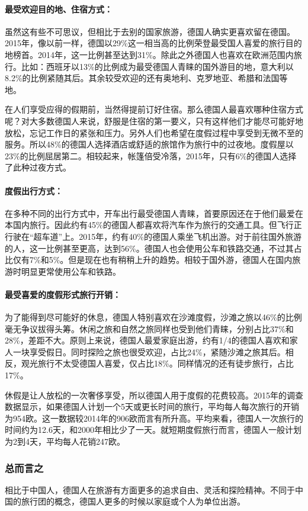 \paragraph{最受欢迎目的地、住宿方式：}

虽然这有些不可思议，但相比于去别的国家旅游，德国人确实更喜欢留在德国。2015年，像以前一样，德国以29\%这一相当高的比例荣登最受国人喜爱的旅行目的地榜首。2014年，这一比例甚至达到31\%。除此之外德国人也喜欢在欧洲范围内旅行。比如：西班牙以13\%的比例成为最受德国人青睐的国外游目的地，意大利以8.2\%的比例紧随其后。其余较受欢迎的还有奥地利、克罗地亚、希腊和法国等地。

在人们享受应得的假期前，当然得提前订好住宿。那么德国人最喜欢哪种住宿方式呢？对大多数德国人来说，舒服是住宿的第一要义，只有这样他们才能尽可能好地放松，忘记工作日的紧张和压力。另外人们也希望在度假过程中享受到无微不至的服务。所以48\%的德国人选择酒店或舒适的旅馆作为旅行中的过夜地。度假屋以23\%的比例屈居第二。相较起来，帐篷倍受冷落，2015年，只有6\%的德国人选择了此种过夜方式。



\paragraph{度假出行方式：}

在多种不同的出行方式中，开车出行最受德国人青睐，首要原因还在于他们最爱在本国内旅行。因此约有45\%的德国人都喜欢将汽车作为旅行的交通工具。但飞行正行驶在“超车道”上。2015年，约有40\%的德国人乘坐飞机出游。对于前往国外旅游的人，这一比例甚至更高，达到56\%。德国人也会使用公车和铁路交通，不过其占比仅有7\%和5\%。但是现在也有稍稍上升的趋势。相较于国外游，德国人在国内旅游时明显更常使用公车和铁路。



\paragraph{最受喜爱的度假形式旅行开销：}

为了能得到尽可能好的休息，德国人特别喜欢在沙滩度假，沙滩之旅以46\%的比例毫无争议拔得头筹。休闲之旅和自然之旅同样也受到他们青睐，分别占比37\%和28\%，差距不大。原则上来说，德国人最爱家庭出游，约有1/4的德国人喜欢和家人一块享受假日。同时探险之旅也很受欢迎，占比24\%，紧随沙滩之旅其后。相反，观光旅行不太受德国人喜爱，仅占比18\%。同样情况的还有徒步旅行，占比17\%。

休假是让人放松的一次奢侈享受，所以德国人用于度假的花费较高。2015年的调查数据显示，如果德国人计划一个5天或更长时间的旅行，平均每人每次旅行的开销为954欧。这一数据较2014年的906欧而言有所升高。平均来看，德国人一次旅行的时间约为12.6天，和2000年相比少了一天。就短期度假旅行而言，德国人一般计划为2到4天，平均每人花销247欧。

\subsubsection{总而言之}

相比于中国人，德国人在旅游有方面更多的追求自由、灵活和探险精神。不同于中国的旅行团的概念，德国人更多的时候以家庭或个人为单位出游。